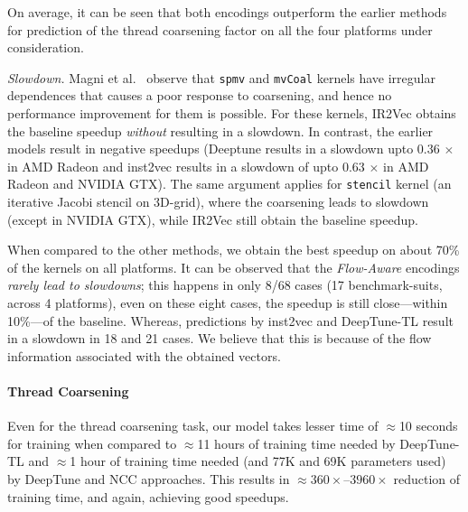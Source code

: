 On average, it can be seen that both encodings outperform the earlier methods for prediction of the thread coarsening factor on all the four platforms under consideration. 

\textit{Slowdown.}  Magni et al.~\cite{magni2014automatic} observe that \texttt{spmv} and \texttt{mvCoal} kernels have irregular dependences that causes a poor response to coarsening, and hence no performance improvement for them is possible.
For these kernels, IR2Vec obtains the baseline speedup \textit{without} resulting in a slowdown. In contrast, the earlier models result in negative speedups (Deeptune results in a slowdown upto $0.36$ $\times$ in AMD Radeon and inst2vec results in a slowdown of upto $0.63$ $\times$ in AMD Radeon and NVIDIA GTX). 
The same argument applies for \texttt{stencil} kernel (an iterative Jacobi stencil on 3D-grid), where the coarsening leads to slowdown (except in NVIDIA GTX), while IR2Vec still obtain the baseline speedup.

When compared to the other methods, we obtain the best speedup on about 70\% of the kernels on all platforms. 
It can be observed that the \textit{Flow-Aware} encodings \textit{rarely lead to slowdowns}; this happens in only 8/68 cases (17 benchmark-suits, across 4 platforms), even on these eight cases, the speedup is still close---within 10\%---of the baseline. 
Whereas, predictions by inst2vec and DeepTune-TL result in a slowdown in 18 and 21 cases.
We believe that this is because of the flow information associated with the obtained vectors.

\paragraph{Thread Coarsening}
Even for the thread coarsening task, our model takes lesser time of $\approx$10 seconds for training when compared to $\approx$11 hours of training time needed by DeepTune-TL and $\approx$1 hour of training time needed (and 77K and 69K parameters used) by DeepTune and NCC approaches. 
This results in $\approx 360\times$--$3960\times$ reduction of training time, and again, achieving good speedups. 